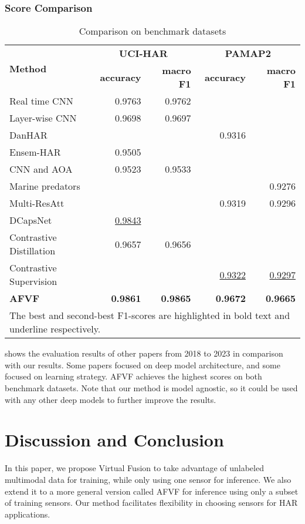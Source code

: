 \documentclass[conference]{IEEEtran}
\begin{document}
\subsubsection{Score Comparison}
\begin{table}
\centering
\caption{Comparison on benchmark datasets}
\label{tab: benchmark compare}
\setlength{\tabcolsep}{3pt}
\begin{tabular}{@{}lrrrr@{}}
\toprule
\multirow{2}{*}{\textbf{Method}} & \multicolumn{2}{c}{\textbf{UCI-HAR}} & \multicolumn{2}{c}{\textbf{PAMAP2}} \\
& \textbf{accuracy} & \textbf{macro F1} & \textbf{accuracy} & \textbf{macro F1} \\ \midrule
Real time CNN \cite{Ignatov2018} & 0.9763 & 0.9762 &  &  \\
Layer-wise CNN \cite{Teng2020} & 0.9698 & 0.9697 &  &  \\
DanHAR \cite{Gao2021} &  &  & 0.9316 &  \\
Ensem-HAR \cite{Bhattacharya2022} & 0.9505 &  &  &  \\
CNN and AOA \cite{Dahou2022} & 0.9523 & 0.9533 &  &  \\
Marine predators \cite{Helmi2023} &  &  &  & 0.9276 \\
Multi-ResAtt \cite{Mohammed2023} &  &  & 0.9319 & 0.9296 \\
DCapsNet \cite{Sezavar2024} & \underline{0.9843} &  &  &  \\
Contrastive Distillation \cite{Xu2023} & 0.9657 & 0.9656 &  &  \\
Contrastive Supervision \cite{Cheng2023} &  &  & \underline{0.9322} & \underline{0.9297} \\
\textbf{AFVF} & \textbf{0.9861} & \textbf{0.9865} & \textbf{0.9672} & \textbf{0.9665} \\ \bottomrule
\multicolumn{5}{p{220pt}}{The best and second-best F1-scores are highlighted in bold text and underline respectively.}
\end{tabular}
\end{table}

 shows the evaluation results of other papers from 2018 to 2023 in comparison with our results. Some papers focused on deep model architecture, and some focused on learning strategy. AFVF achieves the highest scores on both benchmark datasets. Note that our method is model agnostic, so it could be used with any other deep models to further improve the results.

\section{Discussion and Conclusion}
In this paper, we propose Virtual Fusion to take advantage of unlabeled multimodal data for training, while only using one sensor for inference. We also extend it to a more general version called AFVF for inference using only a subset of training sensors. Our method facilitates flexibility in choosing sensors for HAR applications.
\end{document}
